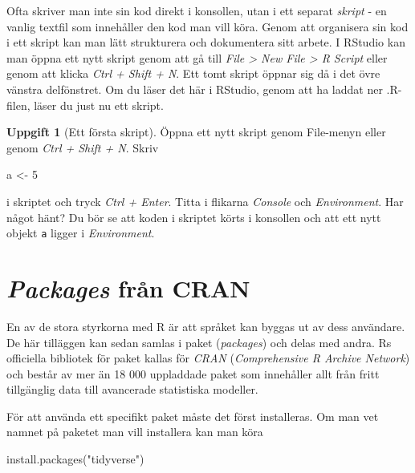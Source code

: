 \documentclass[
]{book}
\newenvironment{Shaded}{\begin{snugshade}}{\end{snugshade}}
\newcommand{\DecValTok}[1]{\textcolor[rgb]{0.00,0.00,0.81}{#1}}
\newcommand{\FunctionTok}[1]{\textcolor[rgb]{0.00,0.00,0.00}{#1}}
\newcommand{\NormalTok}[1]{#1}
\newcommand{\OtherTok}[1]{\textcolor[rgb]{0.56,0.35,0.01}{#1}}
\newcommand{\StringTok}[1]{\textcolor[rgb]{0.31,0.60,0.02}{#1}}
\theoremstyle{definition}
\theoremstyle{definition}
\theoremstyle{definition}
\newtheorem{exercise}{Uppgift}[chapter]
\theoremstyle{definition}
\theoremstyle{remark}
\begin{document}
Ofta skriver man inte sin kod direkt i konsollen, utan i ett separat \emph{skript} - en vanlig textfil som innehåller den kod man vill köra. Genom att organisera sin kod i ett skript kan man lätt strukturera och dokumentera sitt arbete. I RStudio kan man öppna ett nytt skript genom att gå till \emph{File \textgreater{} New File \textgreater{} R Script} eller genom att klicka \emph{Ctrl + Shift + N}. Ett tomt skript öppnar sig då i det övre vänstra delfönstret. Om du läser det här i RStudio, genom att ha laddat ner .R-filen, läser du just nu ett skript.

\begin{exercise}[Ett första skript]
Öppna ett nytt skript genom File-menyn eller genom \emph{Ctrl + Shift + N}.
Skriv

\begin{Shaded}
\begin{Highlighting}[]
\NormalTok{a }\OtherTok{\textless{}{-}} \DecValTok{5}
\end{Highlighting}
\end{Shaded}

i skriptet och tryck \emph{Ctrl + Enter}. Titta i flikarna \emph{Console} och \emph{Environment}. Har något hänt? Du bör se att koden i skriptet körts i konsollen och att ett nytt objekt \texttt{a} ligger i \emph{Environment}.
\end{exercise}

\hypertarget{packages-fruxe5n-cran}{%
\section{\texorpdfstring{\emph{Packages} från CRAN}{Packages från CRAN}}\label{packages-fruxe5n-cran}}

En av de stora styrkorna med R är att språket kan byggas ut av dess användare. De här tilläggen kan sedan samlas i paket (\emph{packages}) och delas med andra. Rs officiella bibliotek för paket kallas för \emph{CRAN} (\emph{Comprehensive R Archive Network}) och består av mer än 18 000 uppladdade paket som innehåller allt från fritt tillgänglig data till avancerade statistiska modeller.

För att använda ett specifikt paket måste det först installeras. Om man vet namnet på paketet man vill installera kan man köra

\begin{Shaded}
\begin{Highlighting}[]
\FunctionTok{install.packages}\NormalTok{(}\StringTok{"tidyverse"}\NormalTok{)}
\end{Highlighting}
\end{Shaded}
\end{document}
